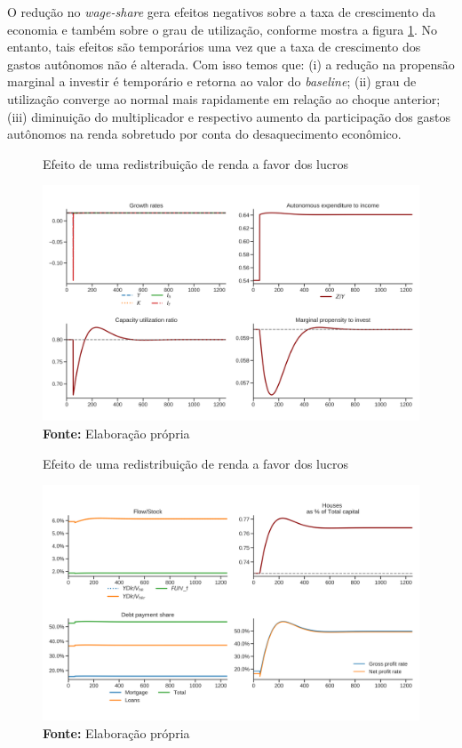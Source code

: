 O redução no \textit{wage-share} gera efeitos negativos sobre a taxa de crescimento da economia e também sobre o grau de utilização, conforme mostra a figura \ref{choque_2}. No entanto, tais efeitos são temporários uma vez que a taxa de crescimento dos gastos autônomos não é alterada. Com isso temos que: (i) a redução na propensão marginal a investir é temporário e retorna ao valor do \textit{baseline}; (ii) grau de utilização converge ao normal mais rapidamente em relação ao choque anterior; (iii) diminuição do multiplicador e respectivo aumento da participação dos gastos autônomos na renda sobretudo por conta do desaquecimento econômico.


\begin{figure}[H]
	\centering
	\caption{Efeito de uma redistribuição de renda a favor dos lucros}
	\label{choque_2}
	\includegraphics[width=\textwidth]{../../Modelo/Versoes/Shock_2.png}
	\caption*{\textbf{Fonte:} Elaboração própria}
\end{figure}


\begin{figure}[H]
	\centering
	\caption{Efeito de uma redistribuição de renda a favor dos lucros}
	\label{choque_2Norms}
	\includegraphics[width=\textwidth]{../../Modelo/Versoes/Shock_2Norms.png}
	\caption*{\textbf{Fonte:} Elaboração própria}
\end{figure}

